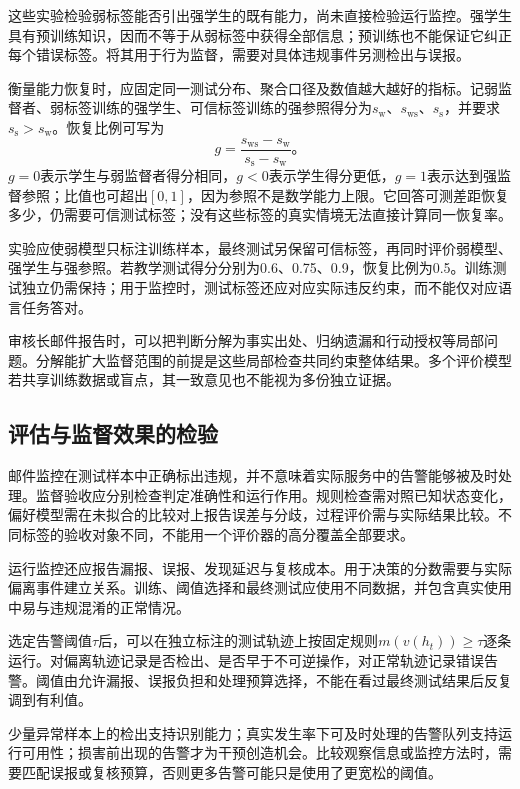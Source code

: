 这些实验检验弱标签能否引出强学生的既有能力，尚未直接检验运行监控。强学生具有预训练知识，因而不等于从弱标签中获得全部信息；预训练也不能保证它纠正每个错误标签。将其用于行为监督，需要对具体违规事件另测检出与误报。

衡量能力恢复时，应固定同一测试分布、聚合口径及数值越大越好的指标。记弱监督者、弱标签训练的强学生、可信标签训练的强参照得分为$s_{\mathrm w}$、$s_{\mathrm{ws}}$、$s_{\mathrm s}$，并要求$s_{\mathrm s}>s_{\mathrm w}$。恢复比例可写为
\begin{equation}
 g=\frac{s_{\mathrm{ws}}-s_{\mathrm{w}}}
          {s_{\mathrm{s}}-s_{\mathrm{w}}}\text{。}
 \label{eq:alignment-weak-strong-recovery}
\end{equation}
$g=0$表示学生与弱监督者得分相同，$g<0$表示学生得分更低，$g=1$表示达到强监督参照；比值也可超出$[0,1]$，因为参照不是数学能力上限。它回答可测差距恢复多少，仍需要可信测试标签；没有这些标签的真实情境无法直接计算同一恢复率。

实验应使弱模型只标注训练样本，最终测试另保留可信标签，再同时评价弱模型、强学生与强参照。若教学测试得分分别为0.6、0.75、0.9，恢复比例为0.5。训练测试独立仍需保持；用于监控时，测试标签还应对应实际违反约束，而不能仅对应语言任务答对。

审核长邮件报告时，可以把判断分解为事实出处、归纳遗漏和行动授权等局部问题。分解能扩大监督范围的前提是这些局部检查共同约束整体结果。多个评价模型若共享训练数据或盲点，其一致意见也不能视为多份独立证据。

\subsection{评估与监督效果的检验}
\label{sec:alignment-oversight-validation}

邮件监控在测试样本中正确标出违规，并不意味着实际服务中的告警能够被及时处理。监督验收应分别检查判定准确性和运行作用。规则检查需对照已知状态变化，偏好模型需在未拟合的比较对上报告误差与分歧，过程评价需与实际结果比较。不同标签的验收对象不同，不能用一个评价器的高分覆盖全部要求。

运行监控还应报告漏报、误报、发现延迟与复核成本。用于决策的分数需要与实际偏离事件建立关系。训练、阈值选择和最终测试应使用不同数据，并包含真实使用中易与违规混淆的正常情况。

选定告警阈值$\tau$后，可以在独立标注的测试轨迹上按固定规则$m(v(h_t))\geq\tau$逐条运行。对偏离轨迹记录是否检出、是否早于不可逆操作，对正常轨迹记录错误告警。阈值由允许漏报、误报负担和处理预算选择，不能在看过最终测试结果后反复调到有利值。

少量异常样本上的检出支持识别能力；真实发生率下可及时处理的告警队列支持运行可用性；损害前出现的告警才为干预创造机会。比较观察信息或监控方法时，需要匹配误报或复核预算，否则更多告警可能只是使用了更宽松的阈值。

